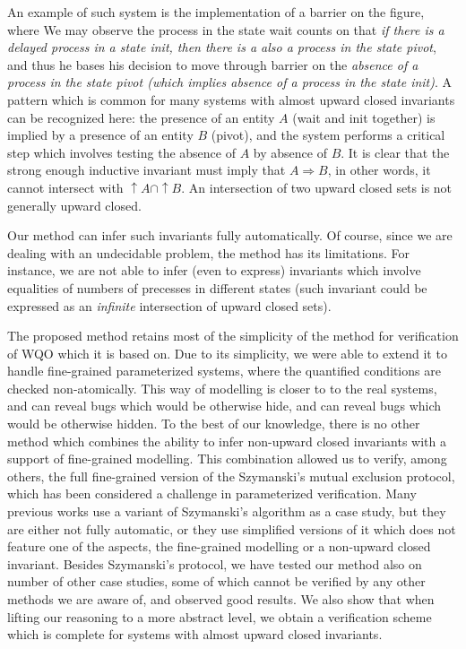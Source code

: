 An example of such system is the implementation of a barrier on the figure, where 
We may observe the process in the state wait counts on that \emph{if there is a delayed process in a state init, then there is a also a process in the state pivot}, 
and thus he bases his decision to move through barrier on the \emph{absence of a process in the state pivot (which implies absence of a process in the state init)}.
A pattern which is common for many systems with almost upward closed invariants can be recognized here: 
the presence of an entity $A$ (wait and init together) is implied by a presence of an entity $B$ (pivot), 
and the system performs a critical step which involves testing the absence of $A$ by absence of $B$. 
It is clear that the strong enough inductive invariant must imply that $A \Rightarrow B$, 
in other words, it cannot intersect with $\uparrow A \cap \uparrow B$. An intersection of two upward closed sets is not generally upward closed.


Our method can infer such invariants fully automatically.
Of course, since we are dealing with an undecidable problem, the method has its limitations. 
For instance, we are not able to infer (even to express) invariants which involve equalities of numbers of precesses in different states 
(such invariant could be expressed as an \emph{infinite} intersection of upward closed sets).

The proposed method retains most of the simplicity of the method \cite{AbHaHo:view:abstraction} for verification of WQO which it is based on.
Due to its simplicity, we were able to extend it to handle fine-grained parameterized systems, 
where the quantified conditions are checked non-atomically. This way of modelling is closer to to the real systems, and can reveal bugs which would be otherwise hide, and can reveal bugs which would be otherwise hidden.
To the best of our knowledge, there is no other method which combines the ability to infer non-upward closed invariants with a support of fine-grained modelling. 
This combination allowed us to verify, among others, the full fine-grained version of the Szymanski's mutual exclusion protocol, 
which has been considered a challenge in parameterized verification. 
Many previous works use a variant of Szymanski's algorithm as a case study, but they are either not fully automatic, or they use simplified versions of it which does not feature one of the aspects, the fine-grained modelling or a non-upward closed invariant. 
Besides Szymanski's protocol, we have tested our method also on number of other case studies, some of which cannot be verified by any other methods we are aware of, and observed good results.
We also show that when lifting our reasoning to a more abstract level, 
we obtain a verification scheme which is complete for systems with almost upward closed invariants.

